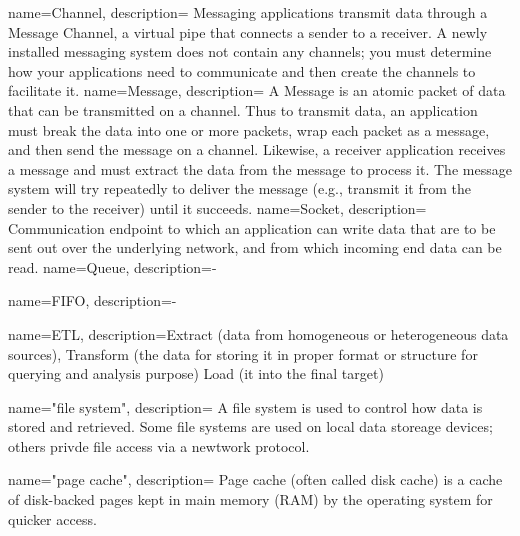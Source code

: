 {
    name=Channel,
    description={
        Messaging applications transmit data through a Message Channel, a virtual
        pipe that connects a sender to a receiver. A newly installed messaging
        system does not contain any channels; you must determine how your
        applications need to communicate and then create the channels to facilitate
        it.
    }
}
{
    name=Message,
    description={
        A Message is an atomic packet of data that can be transmitted on a
        channel. Thus to transmit data, an application must break the data into
        one or more packets, wrap each packet as a message, and then send the
        message on a channel. Likewise, a receiver application receives a
        message and must extract the data from the message to process it. The
        message system will try repeatedly to deliver the message (e.g.,
        transmit it from the sender to the receiver) until it succeeds.
    }
}
{
    name=Socket,
    description={
        Communication endpoint to which an application can write data
        that are to be sent out over the underlying network, and from which incoming end
        data can be read. \cite{TAN06}
    }
}
{
    name=Queue,
    description={-}
}


{
    name=FIFO,
    description={-}
}

{
    name=ETL,
    description={Extract (data from homogeneous or heterogeneous data sources), 
         Transform (the data for storing it in proper format or structure
         for querying and analysis purpose)
         Load (it into the final target)
    }
}

{
    name="file system",
    description={
        A file system is used to control how data is stored and retrieved. Some
        file systems are used on local data storeage devices; others privde file
        access via a newtwork protocol.
    }
}

{
    name="page cache",
    description={
        Page cache (often called disk cache) is a cache of disk-backed pages
        kept in main memory (RAM) by the operating system for quicker access.
    }
}
